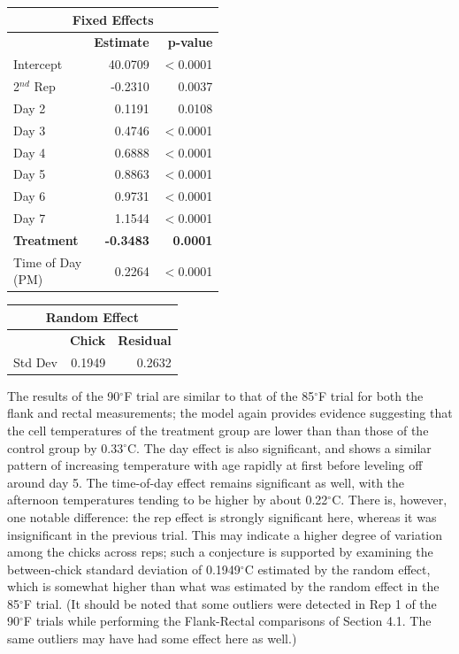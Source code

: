 \documentclass[a4paper, 10pt, titlepage]{article}
\newcommand\Tstrut{\rule{0pt}{2.9ex}}         %
\newcommand\Bstrut{\rule[-1.2ex]{0pt}{0pt}}   %
\begin{document}
\begin{table}[ht]
\centering
{} 
\begin{tabular}[t]{lrr}
 \hline
 \multicolumn{3}{c}{\textbf{Fixed Effects}}\\
 \hline
 & \textbf{Estimate} & \textbf{p-value}\Tstrut\\ 
 Intercept & 40.0709 & $<$0.0001\\
 2$^{nd}$ Rep & -0.2310 & 0.0037\\
 Day 2 & 0.1191 & 0.0108\\
 Day 3 & 0.4746 & $<$0.0001\\
 Day 4 & 0.6888 & $<$0.0001\\
 Day 5 & 0.8863 & $<$0.0001\\
 Day 6 & 0.9731 & $<$0.0001\\
 Day 7 & 1.1544 & $<$0.0001\\
 \textbf{Treatment} & \textbf{-0.3483} & \textbf{0.0001}\\
 \makecell[l]{Time of Day \\ (PM)\Bstrut} & 0.2264 & $<$0.0001\\
 \hline
\end{tabular}
\quad
\begin{tabular}[t]{lrr}
 \hline
\multicolumn{3}{c}{\textbf{Random Effect}}\\
 \hline
 & \textbf{Chick} & \textbf{Residual}\Tstrut \\ 
 Std Dev & 0.1949 & 0.2632\Bstrut\\
 \hline
\end{tabular}
\label{table:Est 90 F}
\end{table}

The results of the 90$^{\circ}$F trial are similar to that of the 85$^{\circ}$F trial for both the flank and rectal measurements; the model again provides evidence suggesting that the cell temperatures of the treatment group are lower than than those of the control group by 0.33$^{\circ}$C. The day effect is also significant, and shows a similar pattern of increasing temperature with age rapidly at first before leveling off around day 5. The time-of-day effect remains significant as well, with the afternoon temperatures tending to be higher by about 0.22$^{\circ}$C. There is, however, one notable difference: the rep effect is strongly significant here, whereas it was insignificant in the previous trial. This may indicate a higher degree of variation among the chicks across reps; such a conjecture is supported by examining the between-chick standard deviation of 0.1949$^{\circ}$C estimated by the random effect, which is somewhat higher than what was estimated by the random effect in the 85$^{\circ}$F trial. (It should be noted that some outliers were detected in Rep 1 of the 90$^{\circ}$F trials while performing the Flank-Rectal comparisons of Section 4.1. The same outliers may have had some effect here as well.)
\end{document}
